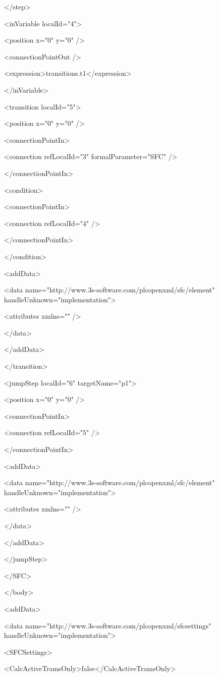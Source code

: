 { </step>

 <inVariable localId="4">

  <position x="0" y="0" />

  <connectionPointOut />

  <expression>transitions.t1</expression>

 </inVariable>

 <transition localId="5">

  <position x="0" y="0" />

  <connectionPointIn>

   <connection refLocalId="3" formalParameter="SFC" />

  </connectionPointIn>

  <condition>

   <connectionPointIn>

    <connection refLocalId="4" />

   </connectionPointIn>

  </condition>

  <addData>

   <data name="http://www.3s-software.com/plcopenxml/sfc/element" handleUnknown="implementation">

    <attributes xmlns="" />

   </data>

  </addData>

 </transition>

 <jumpStep localId="6" targetName="p1">

  <position x="0" y="0" />

  <connectionPointIn>

   <connection refLocalId="5" />

  </connectionPointIn>

  <addData>

   <data name="http://www.3s-software.com/plcopenxml/sfc/element" handleUnknown="implementation">

    <attributes xmlns="" />

   </data>

  </addData>

 </jumpStep>

</SFC>

</body>

<addData>

<data name="http://www.3s-software.com/plcopenxml/sfcsettings" handleUnknown="implementation">

 <SFCSettings>

  <CalcActiveTramsOnly>false</CalcActiveTramsOnly>

}
